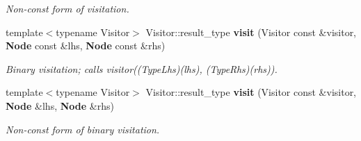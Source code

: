 \begin{CompactItemize}
\begin{CompactList}\small\item\em Non-const form of visitation. \item\end{CompactList}\item 
template$<$typename Visitor$>$ Visitor::result\_\-type {\bf visit} (Visitor const \&visitor, {\bf Node} const \&lhs, {\bf Node} const \&rhs)
\begin{CompactList}\small\item\em Binary visitation; calls visitor((Type\-Lhs)(lhs), (Type\-Rhs)(rhs)). \item\end{CompactList}\item 
template$<$typename Visitor$>$ Visitor::result\_\-type {\bf visit} (Visitor const \&visitor, {\bf Node} \&lhs, {\bf Node} \&rhs)\label{namespacesprite_a70}

\begin{CompactList}\small\item\em Non-const form of binary visitation. \item\end{CompactList}\end{CompactItemize}
